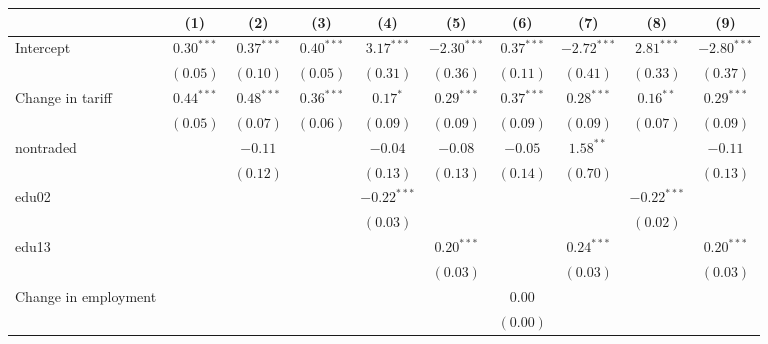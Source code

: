 
\begin{tabular}{l c c c c c c c c c }
\hline
 & (1) & (2) & (3) & (4) & (5) & (6) & (7) & (8) & (9) \\
\hline
Intercept          & $0.30^{***}$ & $0.37^{***}$ & $0.40^{***}$ & $3.17^{***}$  & $-2.30^{***}$ & $0.37^{***}$ & $-2.72^{***}$ & $2.81^{***}$  & $-2.80^{***}$ \\
                     & $(0.05)$     & $(0.10)$     & $(0.05)$     & $(0.31)$      & $(0.36)$      & $(0.11)$     & $(0.41)$      & $(0.33)$      & $(0.37)$      \\
Change in tariff              & $0.44^{***}$ & $0.48^{***}$ & $0.36^{***}$ & $0.17^{*}$    & $0.29^{***}$  & $0.37^{***}$ & $0.28^{***}$  & $0.16^{**}$   & $0.29^{***}$  \\
                     & $(0.05)$     & $(0.07)$     & $(0.06)$     & $(0.09)$      & $(0.09)$      & $(0.09)$     & $(0.09)$      & $(0.07)$      & $(0.09)$      \\
nontraded            &              & $-0.11$      &              & $-0.04$       & $-0.08$       & $-0.05$      & $1.58^{**}$   &               & $-0.11$       \\
                     &              & $(0.12)$     &              & $(0.13)$      & $(0.13)$      & $(0.14)$     & $(0.70)$      &               & $(0.13)$      \\
edu02                &              &              &              & $-0.22^{***}$ &               &              &               & $-0.22^{***}$ &               \\
                     &              &              &              & $(0.03)$      &               &              &               & $(0.02)$      &               \\
edu13                &              &              &              &               & $0.20^{***}$  &              & $0.24^{***}$  &               & $0.20^{***}$  \\
                     &              &              &              &               & $(0.03)$      &              & $(0.03)$      &               & $(0.03)$      \\
Change in employment              &              &              &              &               &               & $0.00$       &               &               &               \\
                     &              &              &              &               &               & $(0.00)$     &               &               &               \\

\end{tabular}
